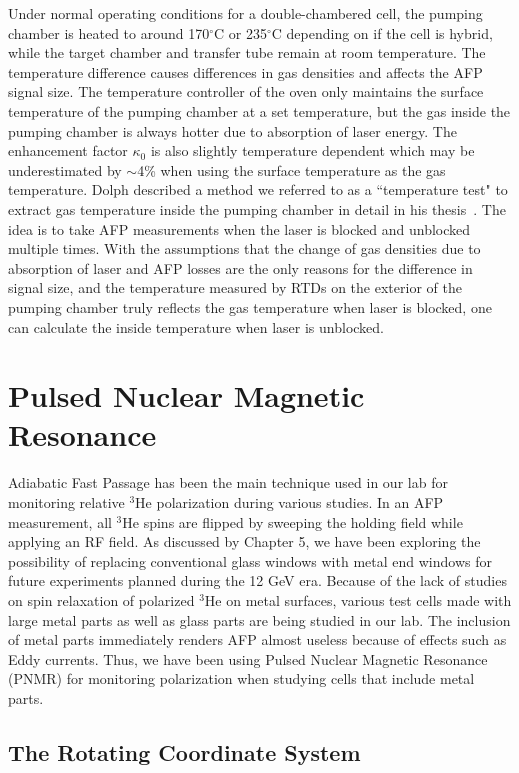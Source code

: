 Under normal operating conditions for a double-chambered cell, the pumping chamber is heated to around 170$^{\circ}$C or 235$^{\circ}$C depending on if the cell is hybrid, while the target chamber and transfer tube remain at room temperature. The temperature difference causes differences in gas densities and affects the AFP signal size. The temperature controller of the oven only maintains the surface temperature of the pumping chamber at a set temperature, but the gas inside the pumping chamber is always hotter due to absorption of laser energy. The enhancement factor $\kappa_{0}$ is also slightly temperature dependent which may be underestimated by $\sim$4\% when using the surface temperature as the gas temperature. Dolph described a method we referred to as a ``temperature test" to extract gas temperature inside the pumping chamber in detail in his thesis~\cite{PeterThesis}. The idea is to take AFP measurements when the laser is blocked and unblocked multiple times. With the assumptions that the change of gas densities due to absorption of laser and AFP losses are the only reasons for the difference in signal size, and the temperature measured by RTDs on the exterior of the pumping chamber truly reflects the gas temperature when laser is blocked, one can calculate the inside temperature when laser is unblocked. 

\section{Pulsed Nuclear Magnetic Resonance} 

Adiabatic Fast Passage has been the main technique used in our lab for monitoring relative $^{3}$He polarization during various studies. In an AFP measurement, all $^{3}$He spins are flipped by sweeping the holding field while applying an RF field. As discussed by Chapter 5, we have been exploring the possibility of replacing conventional glass windows with metal end windows for future experiments planned during the 12 GeV era. Because of the lack of studies on spin relaxation of polarized $^{3}$He on metal surfaces, various test cells made with large metal parts as well as glass parts are being studied in our lab. The inclusion of metal parts immediately renders AFP almost useless because of effects such as Eddy currents. Thus, we have been using Pulsed Nuclear Magnetic Resonance (PNMR) for monitoring polarization when studying cells that include metal parts.

\subsection{The Rotating Coordinate System}

